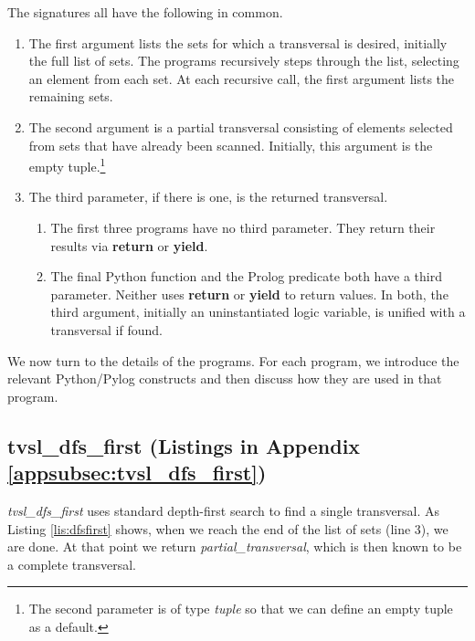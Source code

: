 The signatures all have the following in common. 
\begin{enumerate}
\item The first argument lists the sets for which a transversal is desired, initially the full list of sets. The programs recursively steps through the list, selecting an element from each set. At each recursive call, the first argument lists the remaining sets. 

\item The second argument is a partial transversal consisting of elements selected from sets that have already been scanned. Initially, this argument is the empty tuple.\footnote{The second parameter is of type \textit{tuple} so that we can define an empty tuple as a default.}

\item The third parameter, if there is one, is the returned transversal.
    \begin{enumerate}
    \item The first three programs have no third parameter. They return their results via \textbf{return} or \textbf{yield}.
    
    \item The final Python function and the Prolog predicate both have a third parameter. Neither uses \textbf{return} or \textbf{yield} to return values. In both, the third argument, initially an uninstantiated logic variable, is unified with a transversal if found.
    \end{enumerate}
\end{enumerate}

We now turn to the details of the programs. For each program, we introduce the relevant Python/Pylog constructs and then discuss how they are used in that program.

\subsection{tvsl\_dfs\_first (Listings in Appendix \ref{appsubsec:tvsl_dfs_first})} \label{subsec:tvsl_dfs_first}

\textit{tvsl\_dfs\_first} uses standard depth-first search to find a single transversal. As Listing \ref{lis:dfsfirst} shows, when we reach the end of the list of sets (line 3), we are done. At that point we return  \textit{partial\_transversal}, which is then known to be a complete transversal. 

